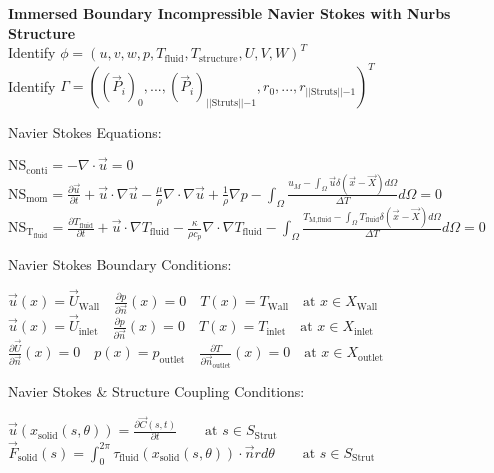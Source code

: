 \documentclass[10pt]{article} %
\begin{document}
\begin{center}
	\textbf{ Immersed Boundary Incompressible Navier Stokes with Nurbs Structure}\\
	Identify $\phi= \left(u,v,w,p,T_{\text{fluid}},T_{\text{structure}},U,V,W\right)^T$\\
	Identify $\Gamma= \left((\vec{P}_{i})_0,...,(\vec{P}_{i})_{\lvert\lvert \text{Struts}\lvert\lvert-1},r_0,...,r_{\lvert\lvert \text{Struts}\lvert\lvert-1} \right)^T$\\
\begin{flushleft}
	Navier Stokes Equations:
\end{flushleft}
	$ \text{NS}_{\text{conti}} =- \nabla \cdot \vec{u} = 0$\\
	$ \text{NS}_{\text{mom}} = \frac{\partial \vec{u}}{\partial t} + \vec{u} \cdot \nabla \vec{u} - \frac{\mu}{\rho} \nabla \cdot \nabla \vec{u} + \frac{1}{\rho} \nabla p - \int_{\Omega} \frac{u_M - \int_{\Omega} \vec{u} \delta(\vec{x}-\vec{X}) d\Omega}{\Delta T} d\Omega = 0$\\
	$\text{NS}_{\text{T}_{\text{fluid}}} = \frac{\partial T_{\text{fluid}}}{\partial t} + \vec{u} \cdot \nabla T_{\text{fluid}} - \frac{\kappa}{\rho c_p} \nabla \cdot \nabla T_{\text{fluid}} - \int_{\Omega} \frac{T_{\text{M,fluid}} - \int_{\Omega} T_{\text{fluid}} \delta(\vec{x}-\vec{X}) d\Omega}{\Delta T} d\Omega = 0$\\
\begin{flushleft}
	Navier Stokes Boundary Conditions:
\end{flushleft}
	$\vec{u}(x)=\vec{U}_{\text{Wall}} \quad \frac{\partial p}{\partial \vec{n}}(x)=0 \quad  T(x) = T_{\text{Wall}} \quad  \text{at } x \in X_{\text{Wall}}$\\
	$\vec{u}(x)=\vec{U}_{\text{inlet}} \quad \frac{\partial p}{\partial \vec{n}}(x)=0 \quad  T(x) = T_{\text{inlet}} \quad \text{at } x \in X_{\text{inlet}}$\\
	$\frac{\partial \vec{U}}{\partial \vec{n}}(x) = 0\quad p(x)=p_{\text{outlet}} \quad  \frac{\partial T}{\partial \vec{n}_{\text{outlet}}}(x) = 0 \quad \text{at } x \in X_{\text{outlet}}$\\
\begin{flushleft}
	Navier Stokes \& Structure Coupling Conditions:
\end{flushleft}
	$\vec{u}(x_{\text{solid}}\left(s,\theta\right))= \frac{\partial \vec{C}(s,t)}{\partial t} \quad \quad \text{at } s \in S_{\text{Strut}}$\\
	$ \vec{F}_{\text{solid}}(s) = \int_0^{2\pi} \tau_{\text{fluid}}(x_{\text{solid}}(s,\theta)) \cdot \vec{n} r d\theta \quad  \quad \text{at } s \in S_{\text{Strut}}$\\

\end{center}
\end{document}
